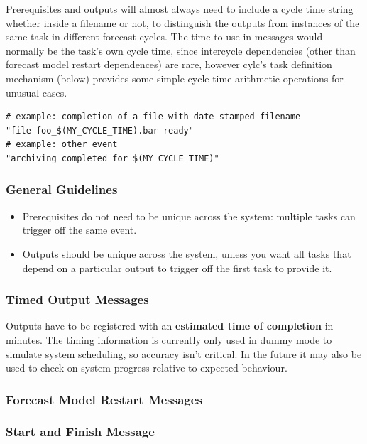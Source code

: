 \documentclass[11pt,a4paper]{article}
\begin{document}
Prerequisites and outputs will almost always need to include a cycle
time string whether inside a
filename or not, to distinguish the outputs from instances of the same
task in different forecast cycles. The time to use in messages would
normally be the task's own cycle time, since intercycle dependencies
(other than forecast model restart dependences) are rare, however cylc's
task definition mechanism (below) provides some simple cycle time
arithmetic operations for unusual cases. 

\lstset{language=Python}
\begin{lstlisting}
# example: completion of a file with date-stamped filename
"file foo_$(MY_CYCLE_TIME).bar ready"
# example: other event
"archiving completed for $(MY_CYCLE_TIME)"
\end{lstlisting}


\subsubsection{General Guidelines}

\begin{itemize}

    \item Prerequisites do not need to be unique across the system:
        multiple tasks can trigger off the same event.

    \item Outputs should be unique across the system, unless you want
        all tasks that depend on a particular output to trigger off the
        first task to provide it.

\end{itemize}

\subsubsection{Timed Output Messages}

Outputs have to be registered with an {\bf estimated time of completion}
in minutes. The timing information is currently only used in dummy mode
to simulate system scheduling, so accuracy isn't critical. In the future
it may also be used to check on system progress relative to expected
behaviour.


\subsubsection{Forecast Model Restart Messages}

\subsubsection{Start and Finish Message}
\end{document}
